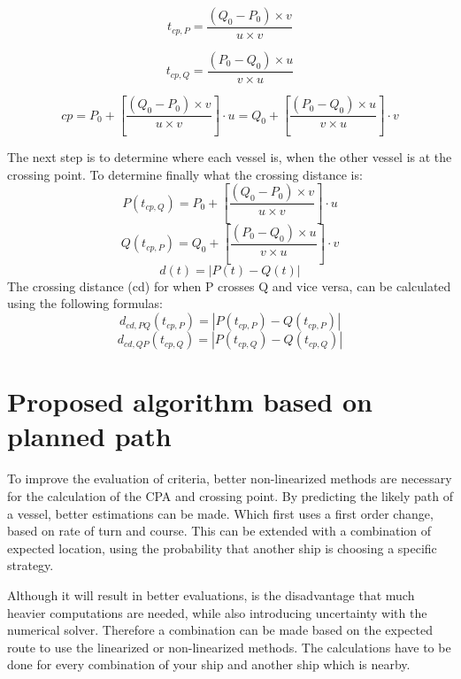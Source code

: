 \begin{equation}
	t_{cp,P} = \frac{(Q_0 - P_0) \times v}{u \times v}
\end{equation}

\begin{equation}
	t_{cp,Q} = \frac{(P_0 - Q_0) \times u}{v \times u}
\end{equation}


\begin{equation}
	cp = P_0 + \left[ \frac{(Q_0 - P_0) \times v}{u \times v} \right] \cdot u =  Q_0 + \left[ \frac{(P_0 - Q_0) \times u}{v \times u} \right] \cdot v
\end{equation}

The next step is to determine where each vessel is, when the other vessel is at the crossing point. To determine finally what the crossing distance is:
\begin{equation}
	P(t_{cp,Q}) = P_0 + \left[ \frac{(Q_0 - P_0) \times v}{u \times v} \right] \cdot u
\end{equation}
\begin{equation}
	Q(t_{cp,P}) = Q_0 + \left[ \frac{(P_0 - Q_0) \times u}{v \times u} \right] \cdot v
\end{equation}
\begin{equation}
	d(t) = |P(t) - Q(t)|
\end{equation}
The crossing distance (cd) for when P crosses Q and vice versa, can be calculated using the following formulas:
\begin{equation}
	d_{cd,PQ}(t_{cp,P}) = |P(t_{cp,P}) - Q(t_{cp,P})|
\end{equation}
\begin{equation}
	d_{cd,QP}(t_{cp,Q}) = |P(t_{cp,Q}) - Q(t_{cp,Q})|
\end{equation}

\section{Proposed algorithm based on planned path}
To improve the evaluation of criteria, better non-linearized methods are necessary for the calculation of the \ac{CPA} and crossing point. By predicting the likely path of a vessel, better estimations can be made. Which first uses a first order change, based on rate of turn and course. This can be extended with a combination of expected location, using the probability that another ship is choosing a specific strategy.

Although it will result in better evaluations, is the disadvantage that much heavier computations are needed, while also introducing uncertainty with the numerical solver. Therefore a combination can be made based on the expected route to use the linearized or non-linearized methods. The calculations have to be done for every combination of your ship and another ship which is nearby.

